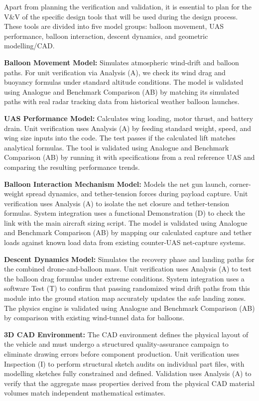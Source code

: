 Apart from planning the verification and validation, it is essential to plan for the V\&V of the specific design tools that will be used during the design process. These tools are divided into five model groups: balloon movement, UAS performance, balloon interaction, descent dynamics, and geometric modelling/CAD.

\textbf{Balloon Movement Model:} Simulates atmospheric wind-drift and balloon paths. For unit verification via Analysis (A), we check its wind drag and buoyancy formulas under standard altitude conditions. The model is validated using Analogue and Benchmark Comparison (AB) by matching its simulated paths with real radar tracking data from historical weather balloon launches.

\textbf{UAS Performance Model:} Calculates wing loading, motor thrust, and battery drain. Unit verification uses Analysis (A) by feeding standard weight, speed, and wing size inputs into the code. The test passes if the calculated lift matches analytical formulas. The tool is validated using Analogue and Benchmark Comparison (AB) by running it with specifications from a real reference UAS and comparing the resulting performance trends.


\textbf{Balloon Interaction Mechanism Model:} Models the net gun launch, corner-weight spread dynamics, and tether-tension forces during payload capture. Unit verification uses Analysis (A) to isolate the net closure and tether-tension formulas. System integration uses a functional Demonstration (D) to check the link with the main aircraft sizing script. The model is validated using Analogue and Benchmark Comparison (AB) by mapping our calculated capture and tether loads against known load data from existing counter-UAS net-capture systems.


\textbf{Descent Dynamics Model:} Simulates the recovery phase and landing paths for the combined drone-and-balloon mass. Unit verification uses Analysis (A) to test the balloon drag formulas under extreme conditions. System integration uses a software Test (T) to confirm that passing randomized wind drift paths from this module into the ground station map accurately updates the safe landing zones. The physics engine is validated using Analogue and Benchmark Comparison (AB) by comparison with existing wind-tunnel data for balloons.

\textbf{3D CAD Environment:} The CAD environment defines the physical layout of the vehicle and must undergo a structured quality-assurance campaign to eliminate drawing errors before component production. Unit verification uses Inspection (I) to perform structural sketch audits on individual part files, with modelling sketches fully constrained and defined. Validation uses Analysis (A) to verify that the aggregate mass properties derived from the physical CAD material volumes match independent mathematical estimates. 
